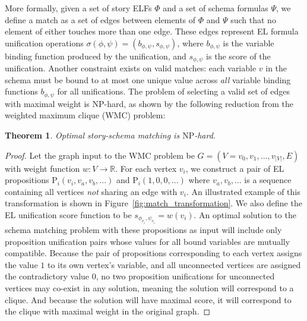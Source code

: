 More formally, given a set of story ELFs $\Phi$ and a set of schema formulas $\Psi$, we define a match as a set of edges between elements of $\Phi$ and $\Psi$ such that no element of either touches more than one edge. These edges represent EL formula unification operations $\sigma(\phi, \psi) = (b_{\phi,\psi}, s_{\phi,\psi})$, where $b_{\phi,\psi}$ is the variable binding function produced by the unification, and $s_{\phi,\psi}$ is the score of the unification. Another constraint exists on valid matches: each variable $v$ in the schema must be bound to at most one unique value across \textit{all} variable binding functions $b_{\phi,\psi}$ for all unifications. The problem of selecting a valid set of edges with maximal weight is $\mathrm{NP}$-hard, as shown by the following reduction from the weighted maximum clique (WMC) problem:

\newtheorem{theorem}{Theorem}
\begin{theorem}
\label{thm:npcomplete}
Optimal story-schema matching is $\mathrm{NP}$-hard.
\end{theorem}
\begin{proof}
Let the graph input to the WMC problem be $G = (V={v_{0}, v_{1}, ..., v_{|V|}},E)$ with weight function $w : V \to \mathbb{R}$. For each vertex $v_{i}$, we construct a pair of EL propositions $\text{P}_{i}(v_{i},v_{a},v_{b},...)$ and $\text{P}_{i}(1,0,0,...)$ where $v_{a},v_{b},...$ is a sequence containing all vertices \textit{not} sharing an edge with $v_{i}$. An illustrated example of this transformation is shown in Figure~\ref{fig:match_transformation}. We also define the EL unification score function to be $s_{\phi_{v_{i}},\psi_{v_{i}}} = w(v_{i})$. An optimal solution to the schema matching problem with these propositions as input will include only proposition unification pairs whose values for all bound variables are mutually compatible. Because the pair of propositions corresponding to each vertex assigns the value $1$ to its own vertex's variable, and all unconnected vertices are assigned the contradictory value $0$, no two proposition unifications for unconnected vertices may co-exist in any solution, meaning the solution will correspond to a clique. And because the solution will have maximal score, it will correspond to the clique with maximal weight in the original graph.
\end{proof}

